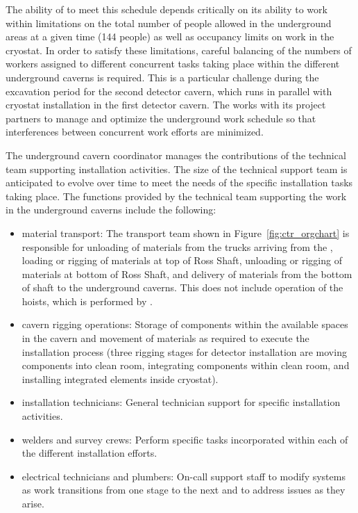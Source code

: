 The ability of  to meet this schedule depends
critically on its ability to work within limitations on the total
number of people allowed in the underground areas at a given time
(144 people) as well as occupancy limits on work in the cryostat.  In order
to satisfy these limitations, careful balancing of the numbers of
workers assigned to different concurrent tasks taking place within the
different underground caverns is required.  This is a particular
challenge during the excavation period for the second detector cavern,
which runs in parallel with cryostat installation in the first
detector cavern.  The  works with its  project 
partners to manage and optimize the underground work schedule so that 
interferences between concurrent work efforts are minimized.

The underground cavern coordinator manages the contributions of 
the technical team supporting  installation activities.
The size of the technical support team is anticipated to evolve  
over time to meet the needs of the specific installation tasks 
taking place.  The functions provided by the technical team 
supporting the work in the underground caverns include the
following:
\begin{itemize}
  \item {material transport:} The transport team shown in
    Figure~\ref{fig:ctr_orgchart} is responsible for unloading of
    materials from the trucks arriving from the , loading
    or rigging of materials at top of Ross Shaft, unloading or rigging
    of materials at bottom of Ross Shaft, and delivery of materials
    from the bottom of shaft to the underground caverns. This does not
    include operation of the hoists, which is performed by
    .
  \item {cavern rigging operations:}  Storage of 
        components within the available spaces 
        in the cavern and movement of materials as required to 
        execute the installation process (three rigging stages
        for detector installation are moving components into 
        clean room, integrating components within clean room, 
        and installing integrated elements inside cryostat).
  \item {installation technicians:}  General technician 
        support for specific installation activities. 
  \item {welders and survey crews:}  Perform 
        specific tasks incorporated within each of the different 
        installation efforts.
  \item {electrical technicians and plumbers:} On-call support staff
    to modify systems as work transitions from one stage to the next
    and to address issues as they arise.
\end{itemize}   
    
